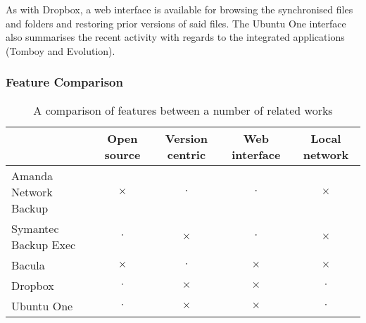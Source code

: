 As with Dropbox, a web interface is available for browsing the synchronised
files and folders and restoring prior versions of said files. The Ubuntu One
interface also summarises the recent activity with regards to the integrated
applications (Tomboy and Evolution).


\subsubsection{Feature Comparison}

\begin{table}[H]
    \centering
    \begin{tabular}{ | l | c | c | c | c | }
        \hline
        & Open source   & Version centric   & Web interface & Local network
            \\ \hline

        Amanda Network Backup   & $\times$  & $\cdot$   & $\cdot$   & $\times$
            \\ \hline

        Symantec Backup Exec    & $\cdot$   & $\times$  & $\cdot$   & $\times$
            \\ \hline

        Bacula                  & $\times$  & $\cdot$   & $\times$  & $\times$
            \\ \hline

        Dropbox                 & $\cdot$   & $\times$  & $\times$  & $\cdot$
            \\ \hline

        Ubuntu One              & $\cdot$   & $\times$  & $\times$  & $\cdot$
            \\ \hline
    \end{tabular}
    \caption{A comparison of features between a number of related works}
    \label{tab:feature-comparison}
\end{table}
